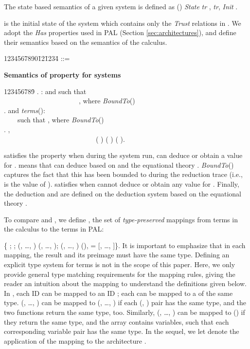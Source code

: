 \documentclass{llncs}
\begin{document}
\begin{ttd}  The state based semantics of a given system is  
defined as ()    \textit{State}   
\textit{tr}  , \textit{tr}, \textit{Init}  .     
\end{ttd}  

 is the initial state of the system  which contains only the 
\textit{Trust} relations in . We adopt the \textit{Has} properties used 
in PAL (Section \ref{sec:architectures}), and define their semantics based on the semantics 
of the calculus.    

\begin{tabbing}
    1234567890\=12\=1234\=\kill
    \>  \> ::= \>        
\end{tabbing}

\begin{ttd}\textbf{Semantics of property  for systems} 
\small
\begin{tabbing}
    123456789\=\kill
    .        :   and  such that\\ 
    \> \ \ \ \ \ \ \ \ \ \ \ \ \ \ \ \ \ \ \ \ \ \     , where \textit{BoundTo}()  \\
    .          and    \textit{terms}():\\ 
    \> \ \ \ \   such that 
        , where \textit{BoundTo}()  \\
    .            ,  \\ 
    \>\ \ \ \ \ \ \ \ \ \ \ \ \ \ \ \ \ \ \ \ \ \ \ \ \ \ \ (  )  (  )  (  ).
\end{tabbing}
\end{ttd}
\normalsize

 satisfies the property  when  
during the system run,  can deduce or obtain a value  for .  
    means that  can deduce  based on  and the equational 
theory . \textit{BoundTo}()   captures the fact that this  has been bounded to  during the 
reduction trace (i.e.,  is the value of ).  satisfies  when  
cannot deduce or obtain any value  for . Finally, the deduction    and    are defined on the deduction system based on the equational theory .  

To compare  and , we define , the set of \textit{type-preserved} 
mappings from terms in the calculus to the terms in PAL:   
  
\{  ;   ; (, \dots, )   (, \dots, ); (, \dots, )  (),  = [, \dots, ]\}. 
It is important to emphasize  
that in each mapping, the result and its preimage must have the same type. Defining an explicit type 
system for terms is not in the scope of this paper. Here, we only provide general type matching 
requirements for the mapping rules, giving the reader an intuition about the mapping 
to understand the definitions given below. In , each ID  can be mapped to an ID 
; each  can be mapped to a  of the same type.   
(, \dots, ) can be mapped to (, \dots, ) if each (, ) pair 
has the same type, and the two functions return the same type, too. Similarly, (, \dots, ) can be mapped 
to () if they return the same type, and the array  contains  variables, such that each corresponding 
variable pair has the same type. In the sequel, 
we let  denote the application of the mapping  to 
the architecture . 
\end{document}
